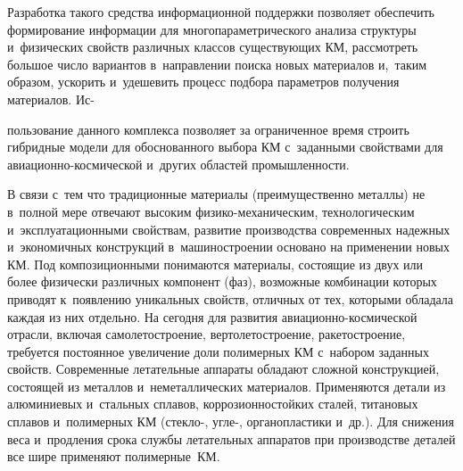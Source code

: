 \begin{multicols}{2}
     Разработка такого средства информационной поддержки поз\-во\-ля\-ет 
обеспечить формирование информации для многопараметрического анализа 
структуры и~физических свойств различных классов су\-ще\-ст\-ву\-ющих 
КМ, рассмотреть большое чис\-ло вариантов 
в~на\-прав\-ле\-нии поиска новых материалов и,~таким образом, ускорить и~удешевить 
процесс подбора па\-ра\-мет\-ров получения материалов.  Ис-\linebreak\vspace*{-12pt}

\pagebreak

\noindent
пользование данного 
комплекса позволяет за ограниченное время строить гиб\-рид\-ные модели для 
обоснованного выбора КМ с~заданными свойствами для  
авиа\-ци\-он\-но-кос\-ми\-че\-ской и~других областей промышленности. 
     
     В связи с~тем что традиционные материалы (преимущественно металлы)
      не в~полной мере отвечают высоким фи\-зи\-ко-ме\-ха\-ни\-че\-ским, 
технологическим и~эксплуатационными свойствам, развитие производства 
современных надежных и~экономичных конструкций в~машиностроении 
основано на применении новых КМ. Под 
композиционными понимаются материалы, со\-сто\-ящие из двух или более 
физически различных компонент (фаз), возможные комбинации которых 
приводят к~появлению уникальных свойств, отличных от тех, которыми обладала 
каж\-дая из них отдельно. На сегодня для развития авиа\-ци\-он\-но-кос\-ми\-че\-ской 
отрасли, включая самолетостроение, вертолетостроение, ракетостроение, 
требуется постоянное увеличение доли полимерных КМ
с~набором заданных свойств. Современные летательные аппараты обладают 
слож\-ной конструкцией, со\-сто\-ящей из металлов и~неметаллических материалов. 
Применяются детали из алю\-ми\-ни\-евых и~сталь\-ных сплавов, коррозионностойких 
сталей, титановых сплавов и~полимерных КМ (стек\-ло-, 
угле-, органопластики и~др.). Для снижения веса и~продления срока службы 
летательных аппаратов при производстве деталей все шире применяют 
полимерные~КМ.
     

\end{multicols}
